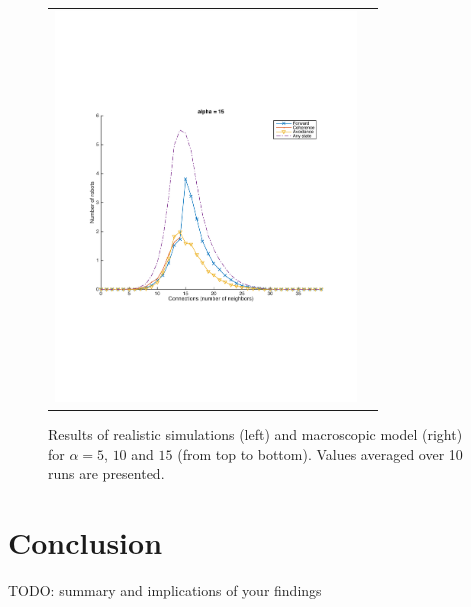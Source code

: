 \documentclass[a4paper, 10pt, conference]{ieeeconf}
\begin{document}
\begin{figure}[p]
\begin{center}
\begin{tabular}{lr}
        \includegraphics[width=8cm]{figures/macroscopic-40-alpha-15.pdf}
      \end{tabular}
      \caption{Results of realistic simulations (left) and macroscopic model (right) for $\alpha = 5$, $10$ and $15$ (from top to bottom). Values averaged over 10 runs are presented.}
    \end{center}
    \label{main-results}
  \end{figure}


\section{Conclusion}
  TODO: summary and implications of your findings



\end{document}
